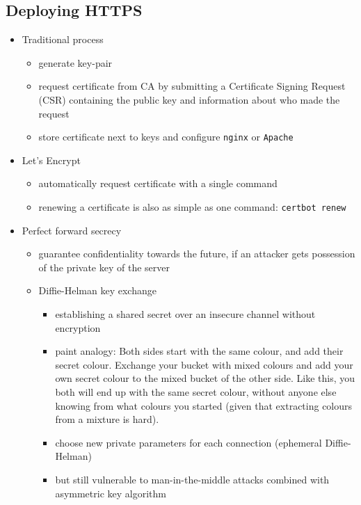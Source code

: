 \documentclass[12pt,titlepage,a4paper]{report}
\begin{document}
	\subsection{Deploying HTTPS}
	\begin{itemize}
		\item Traditional process
		\begin{itemize}
			\item generate key-pair
			\item request certificate from CA by submitting a Certificate Signing Request (CSR) containing the public key and information about who made the request
			\item store certificate next to keys and configure \texttt{nginx} or \texttt{Apache}
		\end{itemize}
		\item Let's Encrypt
		\begin{itemize}
			\item automatically request certificate with a single command
			\item renewing a certificate is also as simple as one command: \texttt{certbot renew}
		\end{itemize}
	
		\item Perfect forward secrecy
		\begin{itemize}
			\item guarantee confidentiality towards the future, if an attacker gets possession of the private key of the server
			\item Diffie-Helman key exchange
			\begin{itemize}
				\item establishing a shared secret over an insecure channel without encryption
				\item paint analogy: Both sides start with the same colour, and add their secret colour. Exchange your bucket with mixed colours and add your own secret colour to the mixed bucket of the other side. Like this, you both will end up with the same secret colour, without anyone else knowing from what colours you started (given that extracting colours from a mixture is hard).
				\item choose new private parameters for each connection (ephemeral Diffie-Helman)
				\item but still vulnerable to man-in-the-middle attacks
					\subitem combined with asymmetric key algorithm
			\end{itemize}
		\end{itemize}
	\end{itemize}
\end{document}

